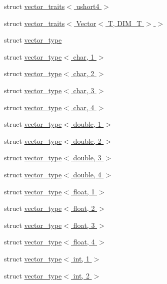 \begin{DoxyCompactItemize}
\item 
struct \hyperlink{structcugar_1_1vector__traits_3_01ushort4_01_4}{vector\+\_\+traits$<$ ushort4 $>$}
\item 
struct \hyperlink{structcugar_1_1vector__traits_3_01_vector_3_01_t_00_01_d_i_m___t_01_4_01_4}{vector\+\_\+traits$<$ Vector$<$ T, D\+I\+M\+\_\+\+T $>$ $>$}
\item 
struct \hyperlink{structcugar_1_1vector__type}{vector\+\_\+type}
\item 
struct \hyperlink{structcugar_1_1vector__type_3_01char_00_011_01_4}{vector\+\_\+type$<$ char, 1 $>$}
\item 
struct \hyperlink{structcugar_1_1vector__type_3_01char_00_012_01_4}{vector\+\_\+type$<$ char, 2 $>$}
\item 
struct \hyperlink{structcugar_1_1vector__type_3_01char_00_013_01_4}{vector\+\_\+type$<$ char, 3 $>$}
\item 
struct \hyperlink{structcugar_1_1vector__type_3_01char_00_014_01_4}{vector\+\_\+type$<$ char, 4 $>$}
\item 
struct \hyperlink{structcugar_1_1vector__type_3_01double_00_011_01_4}{vector\+\_\+type$<$ double, 1 $>$}
\item 
struct \hyperlink{structcugar_1_1vector__type_3_01double_00_012_01_4}{vector\+\_\+type$<$ double, 2 $>$}
\item 
struct \hyperlink{structcugar_1_1vector__type_3_01double_00_013_01_4}{vector\+\_\+type$<$ double, 3 $>$}
\item 
struct \hyperlink{structcugar_1_1vector__type_3_01double_00_014_01_4}{vector\+\_\+type$<$ double, 4 $>$}
\item 
struct \hyperlink{structcugar_1_1vector__type_3_01float_00_011_01_4}{vector\+\_\+type$<$ float, 1 $>$}
\item 
struct \hyperlink{structcugar_1_1vector__type_3_01float_00_012_01_4}{vector\+\_\+type$<$ float, 2 $>$}
\item 
struct \hyperlink{structcugar_1_1vector__type_3_01float_00_013_01_4}{vector\+\_\+type$<$ float, 3 $>$}
\item 
struct \hyperlink{structcugar_1_1vector__type_3_01float_00_014_01_4}{vector\+\_\+type$<$ float, 4 $>$}
\item 
struct \hyperlink{structcugar_1_1vector__type_3_01int_00_011_01_4}{vector\+\_\+type$<$ int, 1 $>$}
\item 
struct \hyperlink{structcugar_1_1vector__type_3_01int_00_012_01_4}{vector\+\_\+type$<$ int, 2 $>$}
\item 

\end{DoxyCompactItemize}
